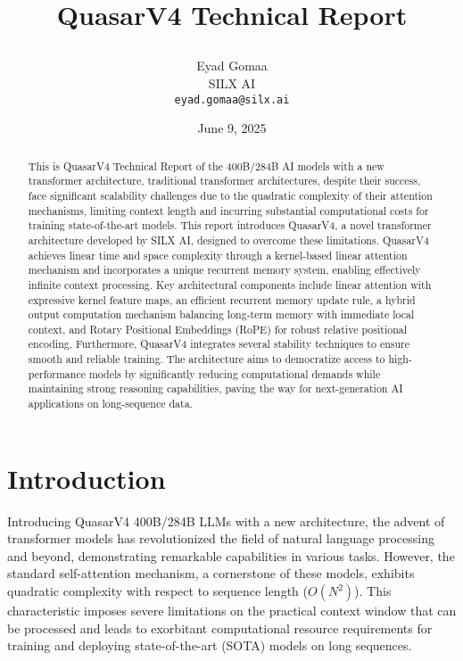\documentclass{article}
\title{QuasarV4 Technical Report

}
\author{
  Eyad Gomaa \\
  SILX AI \\
  \texttt{eyad.gomaa@silx.ai} \\ %
}
\date{June 9, 2025}
\begin{document}
\maketitle


\begin{abstract}
This is QuasarV4 Technical Report of the 400B/284B AI models with a new transformer architecture, traditional transformer architectures, despite their success, face significant scalability challenges due to the quadratic complexity of their attention mechanisms, limiting context length and incurring substantial computational costs for training state-of-the-art models. This report introduces QuasarV4, a novel transformer architecture developed by SILX AI, designed to overcome these limitations. QuasarV4 achieves linear time and space complexity through a kernel-based linear attention mechanism and incorporates a unique recurrent memory system, enabling effectively infinite context processing. Key architectural components include linear attention with expressive kernel feature maps, an efficient recurrent memory update rule, a hybrid output computation mechanism balancing long-term memory with immediate local context, and Rotary Positional Embeddings (RoPE) for robust relative positional encoding. Furthermore, QuasarV4 integrates several stability techniques to ensure smooth and reliable training. The architecture aims to democratize access to high-performance models by significantly reducing computational demands while maintaining strong reasoning capabilities, paving the way for next-generation AI applications on long-sequence data.
\end{abstract}



\section{Introduction}
Introducing QuasarV4 400B/284B LLMs with a new architecture, the advent of transformer models has revolutionized the field of natural language processing and beyond, demonstrating remarkable capabilities in various tasks. However, the standard self-attention mechanism, a cornerstone of these models, exhibits quadratic complexity with respect to sequence length ($O(N^2)$). This characteristic imposes severe limitations on the practical context window that can be processed and leads to exorbitant computational resource requirements for training and deploying state-of-the-art (SOTA) models on long sequences.
\end{document}
